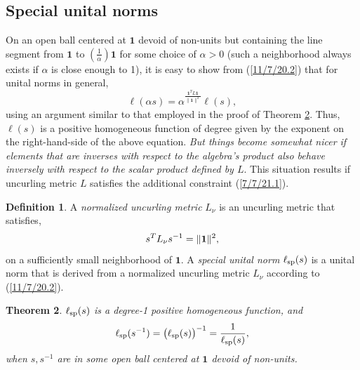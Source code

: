 \documentclass{amsart}
\numberwithin{equation}{section}
\newtheorem{theorem}{Theorem}
\theoremstyle{definition}
\newtheorem{definition}[theorem]{Definition}
\numberwithin{theorem}{section}
\begin{document}
\subsection{Special unital norms}

On an open ball centered at $\mathbf{1}$ devoid of non-units but containing the line segment from $\mathbf{1}$ to $\left(\frac{1}{\alpha}\right)\mathbf{1}$ for some choice of $\alpha>0$ (such a neighborhood always exists if $\alpha$ is close enough to 1), it is easy to show from (\ref{11/7/20.2}) that for unital norms in general,  \[  \ell(\alpha s) = \alpha^{\frac{\mathbf{1}^T L \mathbf{1}}{\|\mathbf{1}\|^2}} \ell(s),\] using an argument similar to that employed in the proof of Theorem \ref{9/24/23.1}. Thus, $ \ell(s)$ is a positive homogeneous function of degree given by the exponent on the right-hand-side of the above equation.  
   {\it But things become somewhat nicer if elements that are inverses with respect to the algebra's product also behave inversely with respect to the scalar product defined by $L$}.  
    This situation results if uncurling metric $L$ satisfies the additional constraint (\ref{7/7/21.1}).
 
\begin{definition}\label{9/20/23.1} A {\it normalized uncurling metric} $L_{\nu}$ is an uncurling metric that satisfies, \begin{equation} \label{7/7/21.1} s^TL_{\nu} s^{-1} =\|{\bf 1}\|^2,\end{equation} on a sufficiently small neighborhood of $\mathbf{1}$.   A {\it special unital norm} $\ell_{\rm sp}(s)$ is a unital norm that is derived from a normalized uncurling metric $L_{\nu}$ according to (\ref{11/7/20.2}). 
\end{definition}

\begin{theorem}\label{9/24/23.1} $ \ell_{\rm sp}(s)$ is a degree-1 positive homogeneous function, and
\begin{equation}\label{5/23/23.3}  \ell_{\rm sp}(s^{-1}) = \big(\ell_{\rm sp}(s)\big)^{-1} = \frac{1}{\ell_{\rm sp}(s)}, \end{equation} when $s,s^{-1}$ are in some open ball centered at $\mathbf{1}$ devoid of non-units. \end{theorem}
\end{document}
